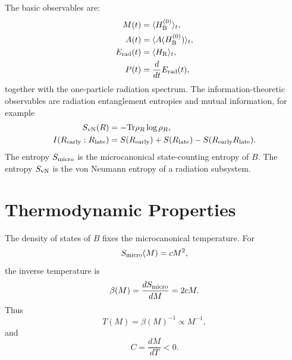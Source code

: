 \documentclass[12pt]{article}
\newcommand{\Tr}{\mathrm{Tr}}
\newcommand{\Smicro}{S_{\rm micro}}
\begin{document}
The basic observables are:
\begin{align}
    M(t)&=\langle H_{\rm B}^{(0)}\rangle_t,\\
    A(t)&=\langle A(H_{\rm B}^{(0)})\rangle_t,\\
    E_{\rm rad}(t)&=\langle H_{\rm R}\rangle_t,\\
    P(t)&=\frac{d}{dt}E_{\rm rad}(t),
\end{align}
together with the one-particle radiation spectrum.  The information-theoretic
observables are radiation entanglement entropies and mutual information, for
example
\begin{align}
    S_{\rm vN}(R)&=-\Tr\rho_R\log\rho_R,\\
    I(R_{\rm early}:R_{\rm late})
    &=S(R_{\rm early})+S(R_{\rm late})-S(R_{\rm early}R_{\rm late}).
\end{align}
The entropy $\Smicro$ is the microcanonical state-counting entropy of $B$.
The entropy $S_{\rm vN}$ is the von Neumann entropy of a radiation subsystem.

\section{Thermodynamic Properties}

The density of states of $B$ fixes the microcanonical temperature.  For
\begin{equation}
    \Smicro(M)=cM^2,
\end{equation}
the inverse temperature is
\begin{equation}
    \beta(M)=\frac{d\Smicro}{dM}=2cM.
\end{equation}
Thus
\begin{equation}
    T(M)=\beta(M)^{-1}\propto M^{-1},
\end{equation}
and
\begin{equation}
    C=\frac{dM}{dT}<0.
\end{equation}
\end{document}

